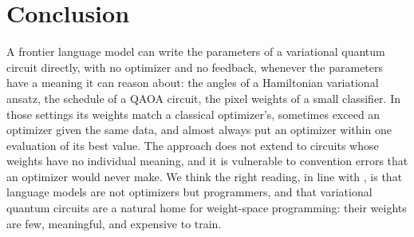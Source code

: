 \section{Conclusion}
\label{sec:conclusion}

A frontier language model can write the parameters of a variational quantum circuit directly, with no optimizer and no feedback, whenever the parameters have a meaning it can reason about: the angles of a Hamiltonian variational ansatz, the schedule of a QAOA circuit, the pixel weights of a small classifier. In those settings its weights match a classical optimizer's, sometimes exceed an optimizer given the same data, and almost always put an optimizer within one evaluation of its best value. The approach does not extend to circuits whose weights have no individual meaning, and it is vulnerable to convention errors that an optimizer would never make. We think the right reading, in line with \citet{takehi2026sparks}, is that language models are not optimizers but programmers, and that variational quantum circuits are a natural home for weight-space programming: their weights are few, meaningful, and expensive to train.
